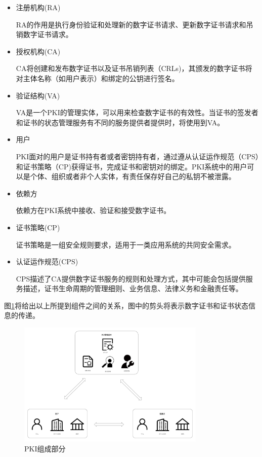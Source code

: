 \begin{itemize}
	\item 

	注册机构(RA)

	RA的作用是执行身份验证和处理新的数字证书请求、更新数字证书请求和吊销数字证书请求。

	\item

	授权机构(CA)

	CA将创建和发布数字证书以及证书吊销列表（CRLs)，其颁发的数字证书将对主体名称（如用户表示）和绑定的公钥进行签名。

	\item

	验证结构(VA)

	VA是一个PKI的管理实体，可以用来检查数字证书的有效性。当证书的签发者和证书的状态管理服务有不同的服务提供者提供时，将使用到VA。

	\item

	用户

	PKI面对的用户是证书持有者或者密钥持有者，通过遵从认证运作规范（CPS）和证书策略（CP)获得证书，完成证书和密钥对的绑定。PKI系统中的用户可以是个体、组织或者非个人实体，有责任保存好自己的私钥不被泄露。

	\item

	依赖方

	依赖方在PKI系统中接收、验证和接受数字证书。

	\item

	证书策略(CP)

	证书策略是一组安全规则要求，适用于一类应用系统的共同安全需求。

	\item

	认证运作规范(CPS)

	CPS描述了CA提供数字证书服务的规则和处理方式，其中可能会包括提供服务描述，证书生命周期的管理细则、业务信息、法律义务和金融责任等。
\end{itemize}

图\ref{fig:pki}将给出以上所提到组件之间的关系，图中的剪头将表示数字证书和证书状态信息的传递。

\begin{figure}[htbp]
 	\centering
 	\includegraphics[width = 0.8\textwidth]{img/pki}
 	\caption{PKI组成部分}\label{fig:pki}
\end{figure}


